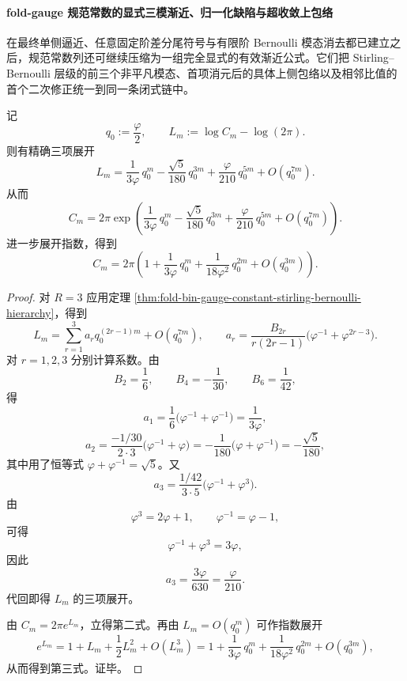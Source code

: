 \paragraph{fold-gauge 规范常数的显式三模渐近、归一化缺陷与超收敛上包络}
在最终单侧逼近、任意固定阶差分尾符号与有限阶 Bernoulli 模态消去都已建立之后，规范常数列还可继续压缩为一组完全显式的有效渐近公式。它们把 Stirling--Bernoulli 层级的前三个非平凡模态、首项消元后的具体上侧包络以及相邻比值的首个二次修正统一到同一条闭式链中。

\begin{theorem}\label{thm:xi-time-part59ac-foldgauge-three-bernoulli-modes}
记
\[
q_0:=\frac{\varphi}{2},
\qquad
L_m:=\log C_m-\log(2\pi).
\]
则有精确三项展开
\[
\boxed{\;
L_m
=
\frac{1}{3\varphi}\,q_0^m
-\frac{\sqrt5}{180}\,q_0^{3m}
+\frac{\varphi}{210}\,q_0^{5m}
+O(q_0^{7m}).\;}
\]
从而
\[
\boxed{\;
C_m
=
2\pi\exp\!\left(
\frac{1}{3\varphi}\,q_0^m
-\frac{\sqrt5}{180}\,q_0^{3m}
+\frac{\varphi}{210}\,q_0^{5m}
+O(q_0^{7m})
\right).\;}
\]
进一步展开指数，得到
\[
\boxed{\;
C_m
=
2\pi\left(
1+\frac{1}{3\varphi}\,q_0^m
+\frac{1}{18\varphi^2}\,q_0^{2m}
+O(q_0^{3m})
\right).\;}
\]
\end{theorem}
\begin{proof}
对 \(R=3\) 应用定理 \ref{thm:fold-bin-gauge-constant-stirling-bernoulli-hierarchy}，得到
\[
L_m=\sum_{r=1}^{3}a_r q_0^{(2r-1)m}+O(q_0^{7m}),
\qquad
a_r=
\frac{B_{2r}}{r(2r-1)}
\bigl(\varphi^{-1}+\varphi^{2r-3}\bigr).
\]
对 \(r=1,2,3\) 分别计算系数。由
\[
B_2=\frac16,\qquad B_4=-\frac1{30},\qquad B_6=\frac1{42},
\]
得
\[
a_1=\frac16\bigl(\varphi^{-1}+\varphi^{-1}\bigr)=\frac{1}{3\varphi},
\]
\[
a_2=
\frac{-1/30}{2\cdot 3}\bigl(\varphi^{-1}+\varphi\bigr)
=-\frac{1}{180}\bigl(\varphi+\varphi^{-1}\bigr)
=-\frac{\sqrt5}{180},
\]
其中用了恒等式 \(\varphi+\varphi^{-1}=\sqrt5\)。又
\[
a_3=
\frac{1/42}{3\cdot 5}\bigl(\varphi^{-1}+\varphi^3\bigr).
\]
由
\[
\varphi^3=2\varphi+1,
\qquad
\varphi^{-1}=\varphi-1,
\]
可得
\[
\varphi^{-1}+\varphi^3=3\varphi,
\]
因此
\[
a_3=\frac{3\varphi}{630}=\frac{\varphi}{210}.
\]
代回即得 \(L_m\) 的三项展开。

由 \(C_m=2\pi e^{L_m}\)，立得第二式。再由 \(L_m=O(q_0^m)\) 可作指数展开
\[
e^{L_m}=1+L_m+\frac12L_m^2+O(L_m^3)
=1+\frac{1}{3\varphi}\,q_0^m+\frac{1}{18\varphi^2}\,q_0^{2m}+O(q_0^{3m}),
\]
从而得到第三式。证毕。
\end{proof}

